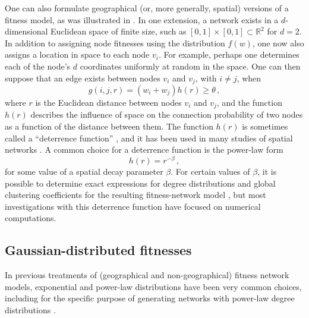 \documentclass[%
 reprint,
 amsmath,amssymb,
 aps,
]{revtex4-1}
\begin{document}
One can also formulate geographical (or, more generally, spatial) versions of a fitness model, as was illustrated in \cite{geographical_threshold, boguna, caldarelli}. In one extension, a network exists in a $d$-dimensional Euclidean space of finite size, such as $[0, 1] \times [0, 1] \subset \mathbb{R}^2$ for $d = 2$. In addition to assigning node fitnesses using the distribution $f(w)$, one now also assigns a location in space to each node $v_i$. For example, perhaps one determines each of the node's $d$ coordinates uniformly at random in the space. One can then suppose that an edge exists between nodes $v_i$ and $v_j$, with $i \neq j$, when
\begin{equation}
    g(i, j, r) = (w_i + w_j)h(r) \geq \theta \,,
\end{equation}
where $r$ is the Euclidean distance between nodes $v_i$ and $v_j$, and the function $h(r)$ describes the influence of space on the connection probability of two nodes as a function of the distance between them. The function $h(r)$ is sometimes called a ``deterrence function'' \cite{barbosa}, and it has been used in many studies of spatial networks \cite{barthelemy}. A common choice for a deterrence function is the power-law form \cite{geographical_threshold}
\begin{equation}\label{distance_equation}
    h(r) = r^{-\beta}\,,
\end{equation}
for some value of a spatial decay parameter $\beta$. For certain values of $\beta$, it is possible to determine exact expressions for degree distributions and global clustering coefficients for the resulting fitness-network model \cite{geographical_threshold}, but most investigations with this deterrence function have focused on numerical computations. 



\subsection{Gaussian-distributed fitnesses}

In previous treatments of (geographical and non-geographical) fitness network models, exponential and power-law distributions have been very common choices, including for the specific purpose of generating networks with power-law degree distributions \cite{geographical_threshold, geographical_threshold2, caldarelli, boguna}.
\end{document}
